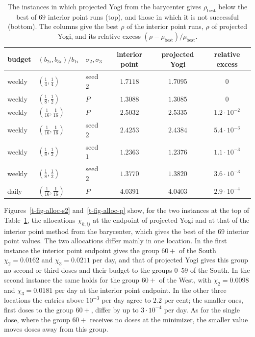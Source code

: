 \documentclass[11pt]{article}
\theoremstyle{plain}
\theoremstyle{definition}
\theoremstyle{remark}
\numberwithin{equation}{section}
\numberwithin{figure}{section}
\numberwithin{table}{section}
\begin{document}
\begin{table}[ht]
\centering
\small
\begin{tabular}{lllccc}
\hline
budget & $(b_{2i},b_{3i})/b_{1i}$ & $\sigma_2,\sigma_3$ & interior point &
projected Yogi & relative excess\\
\hline
weekly & $(\tfrac14,\tfrac14)$       & seed $2$ & $1.7118$ & $1.7095$ & $0$\\
weekly & $(\tfrac18,\tfrac12)$       & $P$      & $1.3088$ & $1.3085$ & $0$\\
\hline
weekly & $(\tfrac1{16},\tfrac1{16})$ & $P$      & $2.5032$ & $2.5335$ & $1.2\cdot 10^{-2}$\\
weekly & $(\tfrac1{16},\tfrac1{16})$ & seed $2$ & $2.4253$ & $2.4384$ & $5.4\cdot 10^{-3}$\\
weekly & $(\tfrac18,\tfrac12)$       & seed $1$ & $1.2363$ & $1.2376$ & $1.1\cdot 10^{-3}$\\
weekly & $(\tfrac18,\tfrac12)$       & seed $2$ & $1.3770$ & $1.3820$ & $3.6\cdot 10^{-3}$\\
daily  & $(\tfrac1{16},\tfrac1{16})$ & $P$      & $4.0391$ & $4.0403$ & $2.9\cdot 10^{-4}$\\
\hline
\end{tabular}
\caption{The instances in which projected Yogi from the barycenter
gives $\rho_{\mathrm{best}}$ below the best of $69$ interior point runs (top),
and those in which it is not successful (bottom). The columns give the best
$\rho$ of the interior point runs, $\rho$ of projected Yogi, and
its relative excess $(\rho-\rho_{\mathrm{best}})/\rho_{\mathrm{best}}$.}\label{t-tab-yogi-inst}
\end{table}

Figures~\ref{t-fig-alloc-s2} and~\ref{t-fig-alloc-p} show, for the two
instances at the top of Table~\ref{t-tab-yogi-inst}, the allocations
$\chi_{k,ij}$ at the endpoint of projected Yogi and at that of the
interior point method from the barycenter, which gives the best of the $69$
interior point values. The two allocations differ mainly in one location. In
the first instance the interior point endpoint gives the group $60+$ of the
South $\chi_{2}=0.0162$ and $\chi_{3}=0.0211$ per day, and that of
projected Yogi gives this group no second or third doses and their
budget to the groups $0$--$59$ of the South. In the second instance the same
holds for the group $60+$ of the West, with $\chi_{2}=0.0098$ and
$\chi_{3}=0.0181$ per day at the interior point endpoint. In the other three
locations the entries above $10^{-3}$ per day agree to $2.2$ per cent; the
smaller ones, first doses to the group $60+$, differ by up to
$3\cdot 10^{-4}$ per day. As for the single dose, where the group $60+$
receives no doses at the minimizer, the smaller value moves doses away from
this group.
\end{document}
